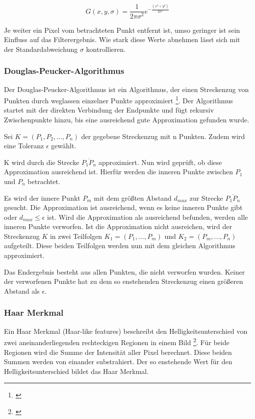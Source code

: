 \[
G(x, y, \sigma) = \frac{1}{2\pi\sigma^2} e^{-\frac{(x^2 + y^2)}{2 \sigma^2}}
\]

Je weiter ein Pixel vom betrachteten Punkt entfernt ist, umso geringer ist sein Einfluss auf das Filterergebnis.
Wie stark diese Werte abnehmen lässt sich mit der Standardabweichung $\sigma$ kontrollieren.

\subsubsection{Douglas-Peucker-Algorithmus}
\label{sec:douglas}

Der Douglas-Peucker-Algorithmus ist ein Algorithmus, der einen Streckenzug von Punkten durch weglassen einzelner Punkte approximiert \footnote{\cite{douglasalgorithms}}.
Der Algorithmus startet mit der direkten Verbindung der Endpunkte und fügt rekursiv Zwischenpunkte hinzu, bis eine ausreichend gute Approximation gefunden wurde.

Sei $K = (P_1, P_2, ..., P_n)$ der gegebene Streckenzug mit n Punkten. Zudem wird eine Toleranz $\epsilon$ gewählt.

K wird durch die Strecke $\overline{P_1P_n}$ approximiert. Nun wird geprüft, ob diese Approximation ausreichend ist.
Hierfür werden die inneren Punkte zwischen $P_1$ und $P_n$ betrachtet.

Es wird der innere Punkt $P_m$ mit dem größten Abstand $d_{max}$ zur Strecke $\overline{P_1P_n}$ gesucht.
Die Approximation ist ausreichend, wenn es keine inneren Punkte gibt oder $d_{max} \leq \epsilon$ ist. Wird die Approximation als ausreichend befunden, werden alle inneren Punkte verworfen. Ist die Approximation nicht ausreichen, wird der Streckenzug $K$ in zwei Teilfolgen $K_1 = (P_1, ..., P_m)$ und $K_2 = (P_m, ... , P_n)$ aufgeteilt. Diese beiden Teilfolgen werden nun mit dem gleichen Algorithmus approximiert.

Das Endergebnis besteht aus allen Punkten, die nicht verworfen wurden. Keiner der verworfenen Punkte hat zu dem so enstehenden Streckenzug einen größeren Abstand als $\epsilon$.


\subsubsection{Haar Merkmal}
\label{sec:haar}

Ein Haar Merkmal (Haar-like features) beschreibt den Helligkeitsunterschied von zwei aneinanderliegenden rechteckigen Regionen in einem Bild \footnote{\cite{Viola01rapidobject}}.
Für beide Regionen wird die Summe der Intensität aller Pixel berechnet. Diese beiden Summen werden von einander substrahiert. Der so enstehende Wert für den Helligkeitsunterschied bildet das Haar Merkmal.

